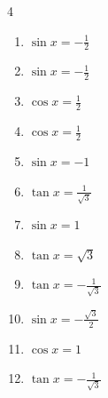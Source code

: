 \begin{multicols}{4}
\begin{enumerate}
  \item $\displaystyle \sin{x}  = -\frac{1}{2}$


\columnbreak %

  \item $\displaystyle \sin{x}  = -\frac{1}{2}$


  \item $\displaystyle \cos{x}  = \frac{1}{2}$


  \item $\displaystyle \cos{x}  = \frac{1}{2}$


  \item $\displaystyle \sin{x}  = -1$


  \item $\displaystyle \tan{x}  = \frac{1}{\sqrt{3}}$


  \item $\displaystyle \sin{x}  = 1$


  \item $\displaystyle \tan{x}  = \sqrt{3}$


  \item $\displaystyle \tan{x}  = -\frac{1}{\sqrt{3}}$


  \item $\displaystyle \sin{x}  = -\frac{\sqrt{3}}{2}$


  \item $\displaystyle \cos{x}  = 1$


  \item $\displaystyle \tan{x}  = -\frac{1}{\sqrt{3}}$


\end{enumerate}
\end{multicols}
